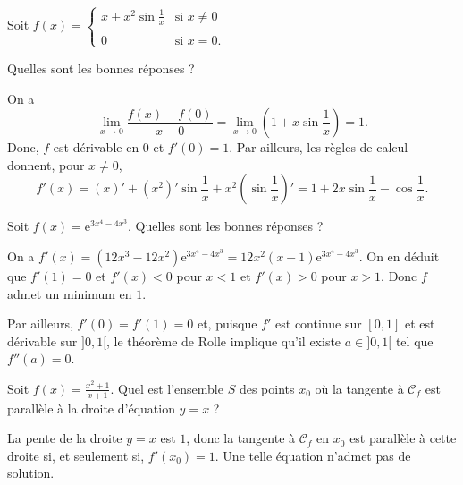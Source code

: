 \begin{question}
Soit $f(x)=\left\{\begin{array}{cl}\displaystyle x+x^2\sin \frac{1}{x}&\mbox{si }x\neq 0\\ \\ 0&\mbox{si }x=0.\end{array}\right.$

Quelles sont les bonnes réponses ?
\begin{answers}  
\end{answers}
\begin{explanations}
On a
$$\lim_{x\to 0}\frac{f(x)-f(0)}{x-0}=\lim_{x\to 0}\left(1+x\sin \frac{1}{x}\right)=1.$$
Donc, $f$ est dérivable en $0$ et $f'(0)=1$. Par ailleurs, les règles de calcul donnent, pour $x\neq 0$,
$$f'(x)=(x)'+(x^2)'\sin \frac{1}{x}+x^2\left(\sin \frac{1}{x}\right)'=1+2x\sin \frac{1}{x}-\cos \frac{1}{x}.$$
\end{explanations}
\end{question}




\begin{question}
Soit $\displaystyle f(x)=\mathrm{e}^{3x^4-4x^3}$. Quelles sont les bonnes réponses ?
\begin{answers}  
    \good{Il existe $a\in ]0,1[$ tel que $f''(a)=0$.}
\end{answers}
\begin{explanations}
On a $f'(x)=(12x^3-12x^2)\mathrm{e}^{3x^4-4x^3}=12x^2(x-1)\mathrm{e}^{3x^4-4x^3}$. On en déduit que $f'(1)=0$ et $f'(x)<0$ pour $x<1$ et $f'(x)>0$ pour $x>1$. Donc $f$ admet un minimum en $1$.

Par ailleurs, $f'(0)=f'(1)=0$ et, puisque $f'$ est continue sur $[0,1]$ et est dérivable sur $]0,1[$, le théorème de Rolle implique qu'il existe $a\in ]0,1[$ tel que $f''(a)=0$.
\end{explanations}
\end{question}






\begin{question}
Soit $\displaystyle f(x)=\frac{x^2+1}{x+1}$. Quel est l'ensemble $S$ des points $x_0$ où la tangente à $\mathscr{C}_f$ est parallèle à la droite d'équation $y=x$ ?
\begin{answers}  
\end{answers}
\begin{explanations}
La pente de la droite $y=x$ est $1$, donc la tangente à $\mathscr{C}_f$ en $x_0$ est parallèle à cette droite si, et seulement si, $f'(x_0)=1$. Une telle équation n'admet pas de solution.
\end{explanations}
\end{question}



